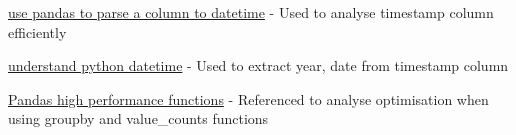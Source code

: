 \documentclass[12pt,a4paper,final]{article}
\begin{document}
\href{https://pandas.pydata.org/pandas-docs/stable/reference/api/pandas.to_datetime.html}{use pandas to parse a column to datetime}
\newline - Used to analyse timestamp column efficiently

\href{https://docs.python.org/3/library/datetime.html} {understand python datetime}
\newline - Used to extract year, date from timestamp column

\href{https://books.google.co.uk/books?id=LcHgDwAAQBAJ&pg=PT337&lpg=PT337&dq=pandas+value_counts+performance&source=bl&ots=bgNWdiwkVC&sig=ACfU3U0bGo5e7tdN6bztLRuGNm3EC1vI6Q&hl=en&sa=X&ved=2ahUKEwjzpMjT9JzpAhXDTxUIHXdJDBgQ6AEwBnoECAoQAQ#v=onepage&q=pandas%20value_counts%20performance&f=false} {Pandas high performance functions}
\newline - Referenced to analyse optimisation when using groupby and value_counts functions
\end{document}
